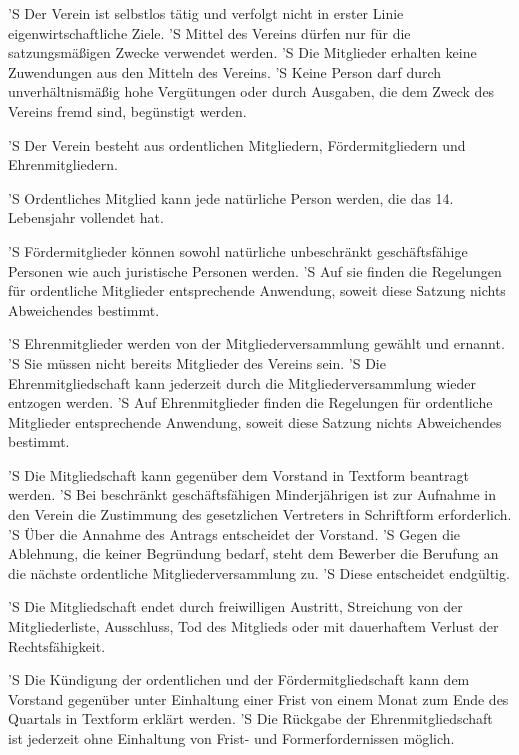 \documentclass[a4paper,10pt]{scrreprt}
\begin{document}
\begin{contract}
'S Der Verein ist selbstlos tätig und verfolgt nicht in erster Linie
eigenwirtschaftliche Ziele.
'S Mittel des Vereins dürfen nur für die satzungsmäßigen Zwecke verwendet
werden.
'S Die Mitglieder erhalten keine Zuwendungen aus den Mitteln des Vereins.
'S Keine Person darf durch unverhältnismäßig hohe Vergütungen oder durch
Ausgaben, die dem Zweck des Vereins fremd sind, begünstigt werden.


'S Der Verein besteht aus ordentlichen Mitgliedern, Fördermitgliedern und
Ehrenmitgliedern.

'S Ordentliches Mitglied kann jede natürliche Person werden, die das 14.
Lebensjahr vollendet hat.

'S Fördermitglieder können sowohl natürliche unbeschränkt geschäftsfähige
Personen wie auch juristische Personen werden.
'S Auf sie finden die Regelungen für ordentliche Mitglieder entsprechende
Anwendung, soweit diese Satzung nichts Abweichendes bestimmt.

'S Ehrenmitglieder werden von der Mitgliederversammlung gewählt und ernannt.
'S Sie müssen nicht bereits Mitglieder des Vereins sein.
'S Die Ehrenmitgliedschaft kann jederzeit durch die Mitgliederversammlung
wieder entzogen werden.
'S Auf Ehrenmitglieder finden die Regelungen für ordentliche Mitglieder
entsprechende Anwendung, soweit diese Satzung nichts Abweichendes bestimmt.


'S Die Mitgliedschaft kann gegenüber dem Vorstand in Textform beantragt werden.
'S Bei beschränkt geschäftsfähigen Minderjährigen ist zur Aufnahme in den
Verein die Zustimmung des gesetzlichen Vertreters in Schriftform erforderlich.
'S Über die Annahme des Antrags entscheidet der Vorstand.
'S Gegen die Ablehnung, die keiner Begründung bedarf, steht dem Bewerber die
Berufung an die nächste ordentliche Mitgliederversammlung zu.
'S Diese entscheidet endgültig.

'S Die Mitgliedschaft endet durch freiwilligen Austritt, Streichung von der
Mitgliederliste, Ausschluss, Tod des Mitglieds oder mit dauerhaftem Verlust der
Rechtsfähigkeit.

'S Die Kündigung der ordentlichen und der Fördermitgliedschaft kann dem
Vorstand gegenüber unter Einhaltung einer Frist von einem Monat zum Ende des
Quartals in Textform erklärt werden.
'S Die Rückgabe der Ehrenmitgliedschaft ist jederzeit ohne Einhaltung von
Frist- und Formerfordernissen möglich.


\end{contract}
\end{document}
